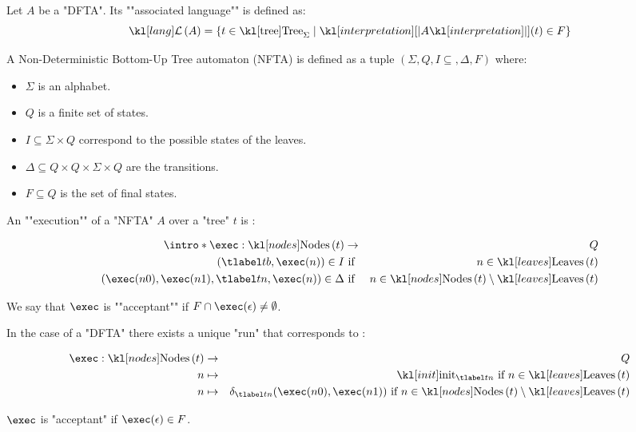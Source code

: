 \documentclass{article}
\begin{document}
\begin{definition}
	Let $A$ be a "DFTA". Its ""associated language"" is defined as:
	\[\lang A = \setdef {t \in \tree_{\Sigma}} {\interpret A (t) \in F}\]
\end{definition}

\begin{definition}
	A Non-Deterministic Bottom-Up Tree automaton (NFTA) is defined as a tuple
	$(\Sigma, Q, I \subseteq, \Delta , F )$ where:
	\begin{itemize}
		\item $\Sigma$ is an alphabet.
		\item $Q$ is a finite set of states.
		\item $I \subseteq \Sigma \times Q$ correspond to the possible states of the leaves.
		\item $\Delta \subseteq Q \times Q \times \Sigma \times Q$ are the transitions.
		\item $F \subseteq Q$ is the set of final states.
	\end{itemize}
\end{definition}


\begin{definition}
	An ""execution"" of a "NFTA" $A$ over a "tree" $t$ is :

	\begin{eqnarray*}
		\intro* \exec : \nodes t &\to& Q \\
		(\tlabel t b,  \exec (n) ) \in I &\text{ if }& n \in \leaves t \\
		(\exec (n0), \exec (n1), \tlabel t n, \exec (n)) \in \Delta &\text{ if }& n \in \nodes t \setminus \leaves t
	\end{eqnarray*}

	We say that $\exec$ is ""acceptant"" if $F \cap \exec (\epsilon) \neq \emptyset$.
\end{definition}

\begin{remark}
	In the case of a "DFTA" there exists a unique "run" that corresponds to :

	\begin{eqnarray*}
		\exec : \nodes t &\to & Q \\
		n  &\mapsto& \init_{\tlabel t n} \text{ if } n \in \leaves t \\
		n  &\mapsto& \delta_{\tlabel t n}(\exec (n0), \exec (n1)) \text{ if } n \in \nodes t \setminus \leaves t
	\end{eqnarray*}

	$\exec$ is "acceptant" if $\exec (\epsilon) \in F$.
\end{remark}
\end{document}
